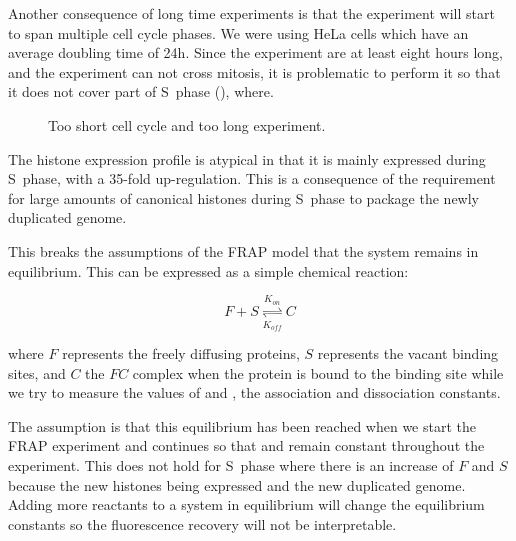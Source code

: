   Another consequence of long time experiments is that the experiment will start to span
  multiple cell cycle phases. We were using HeLa cells which have an average doubling time of 24h.
  Since the experiment are at least eight hours long, and the experiment can not cross mitosis,
  it is problematic to perform it so that it does not cover part of S~phase (),
  where.
  
  \begin{figure}
    \centering
                 {Too short cell cycle and too long experiment.}
    \label{fig:cell-cycle-watch}
  \end{figure}
  
  The histone expression profile is atypical in that it is mainly expressed during S~phase, with
  a 35-fold up-regulation\addref. This is a consequence of the requirement for large amounts of
  canonical histones during S~phase to package the newly duplicated genome.
  
  This breaks the assumptions of the FRAP model that the system remains in equilibrium. This can be
  expressed as a simple chemical reaction:
    
  \begin{displaymath}
    F + S \overset{K_{on}}{\underset{K_{off}}{\rightleftharpoons}} C
  \end{displaymath}
  
  where $F$ represents the freely diffusing proteins, $S$ represents the vacant binding sites, and
  $C$ the $FC$ complex when the protein is bound to the binding site while we try to measure the
  values of \Kon and \Koff, the association and dissociation constants.
  
  The assumption is that this equilibrium has been reached when we start the FRAP experiment and
  continues so that \Kon and \Koff remain constant throughout the experiment. This does
  not hold for S~phase where there is an increase of $F$ and $S$ because the new histones being expressed
  and the new duplicated genome. Adding more reactants to a system in equilibrium will change the equilibrium
  constants so the fluorescence recovery will not be interpretable.
  
